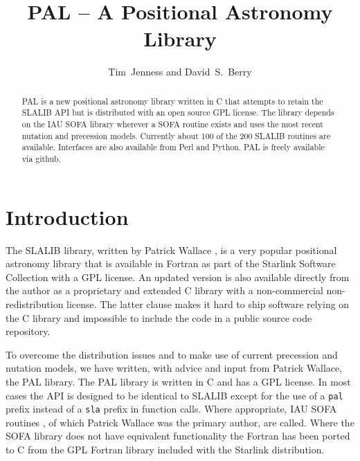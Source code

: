 
\resetcounters




\title{PAL -- A Positional Astronomy Library}
\author{Tim~Jenness and David~S.~Berry
}


\begin{abstract}
  PAL is a new positional astronomy library written in C that attempts
  to retain the SLALIB API but is distributed with an open source GPL
  license. The library depends on the IAU SOFA library wherever a SOFA
  routine exists and uses the most recent nutation and precession
  models. Currently about 100 of the 200 SLALIB routines are
  available. Interfaces are also available from Perl and Python. PAL
  is freely available via github.
\end{abstract}

\section{Introduction}

The SLALIB library, written by Patrick Wallace
\citep{1994ASPC...61..481W}, is a very popular positional astronomy
library that is available in Fortran as part of the Starlink Software
Collection \citep[e.g.][]{2009ASPC..411..418J} with a GPL license. An
updated version is also available directly from the author as a
proprietary and extended C library with a non-commercial
non-redistribution license. The latter clause makes it hard to ship
software relying on the C library and impossible to include the code
in a public source code repository.

To overcome the distribution issues and to make use of current
precession and nutation models, we have written, with advice and input
from Patrick Wallace, the PAL library. The PAL library is written in C
and has a GPL license. In most cases the API is designed to be
identical to SLALIB except for the use of a \texttt{pal} prefix instead of a
\texttt{sla} prefix in function calls. Where appropriate, IAU SOFA routines
\citep{Hohenkerk:2010,1996ASPC..101..207W}, of which Patrick Wallace
was the primary author, are called. Where the SOFA library does not
have equivalent functionality the Fortran has been ported to C from
the GPL Fortran library included with the Starlink distribution.

